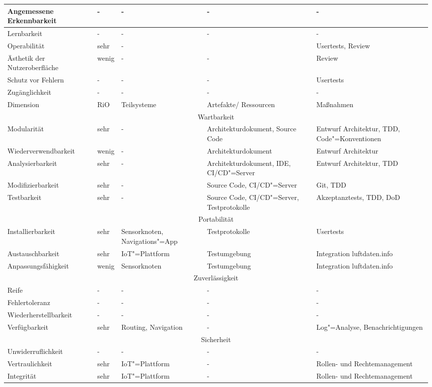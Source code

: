 \begin{landscape}
\begin{longtable}{|p{4.5cm}|p{1.5cm}|p{4.5cm}|p{4.5cm}|p{3.5cm}|}
   Angemessene Erkennbarkeit & - & - & - & - \\ \hline
   Lernbarkeit & - & - & - & - \\ \hline
   Operabilität & sehr & - &  & Usertests, Review \\ \hline
   Ästhetik der Nutzeroberfläche & wenig & - & - & Review \\ \hline
   Schutz vor Fehlern & - & - & - & Usertests \\ \hline
   Zugänglichkeit & - & - & - & - \\ \hline   
   Dimension & RiO & Teilsysteme & Artefakte/ Ressourcen & Maßnahmen\\ \hline   
   \multicolumn{5}{|c|}{Wartbarkeit} \\ \hline
   Modularität & sehr & - & Architekturdokument, Source Code & Entwurf Architektur, TDD, Code"=Konventionen \\ \hline 
   Wiederverwendbarkeit & wenig & - & Architekturdokument & Entwurf Architektur \\ \hline    
   Analysierbarkeit & sehr & - & Architekturdokument, IDE, CI/CD"=Server & Entwurf Architektur, TDD \\ \hline
   Modifizierbarkeit & sehr & - & Source Code, CI/CD"=Server & Git, TDD \\ \hline  
   Testbarkeit & sehr & - & Source Code, CI/CD"=Server, Testprotokolle & Akzeptanztests, TDD, DoD \\ \hline   
   \multicolumn{5}{|c|}{Portabilität} \\ \hline    
   Installierbarkeit & sehr & Sensorknoten, Navigations"=App & Testprotokolle & Usertests \\ \hline
   Austauschbarkeit & sehr & IoT"=Plattform & Testumgebung & Integration luftdaten.info \\ \hline   
   Anpassungsfähigkeit & wenig & Sensorknoten & Testumgebung & Integration luftdaten.info \\ \hline 
   \multicolumn{5}{|c|}{Zuverlässigkeit} \\ \hline
   Reife & - & - & - & - \\ \hline
   Fehlertoleranz & - & - & - & - \\ \hline
   Wiederherstellbarkeit & - & - & - & - \\ \hline
   Verfügbarkeit & sehr & Routing, Navigation & - & Log"=Analyse, Benachrichtigungen \\ \hline
   \multicolumn{5}{|c|}{Sicherheit} \\ \hline
   Unwiderruflichkeit & - & - & - & - \\ \hline   
   Vertraulichkeit & sehr & IoT"=Plattform & - & Rollen- und Rechtemanagement \\ \hline 
   Integrität & sehr & IoT"=Plattform & - & Rollen- und Rechtemanagement \\ \hline 
 \end{longtable}
\end{landscape}

